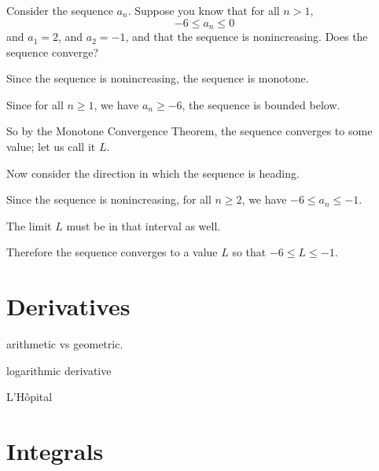 \documentclass{ximera}
\begin{document}
\begin{question}
  Consider the sequence $a_{n}$.  Suppose you know that for all $n >
  1$,
  \[
  -6 \le a_{n} \le 0
  \]
  and $a_{1} = 2$, and $a_{2} = -1$, and that the sequence is
  nonincreasing.  Does the sequence converge?
  \begin{hint}
    Since the sequence is nonincreasing, the sequence is monotone.
  \end{hint}
  \begin{hint}
    Since for all $n \ge 1$, we have $a_{n} \ge -6$, the sequence is
    bounded below.
  \end{hint}
  \begin{hint}
    So by the Monotone Convergence Theorem, the sequence converges to
    some value; let us call it $L$.
  \end{hint}
  \begin{hint}
    Now consider the direction in which the sequence is heading.
  \end{hint}
  \begin{hint}
    Since the sequence is nonincreasing, for all $n \ge 2$, we have
    $-6 \le a_{n} \le -1$.
  \end{hint}
  \begin{hint}
    The limit $L$ must be in that interval as well.
  \end{hint}
  \begin{hint}
    Therefore the sequence converges to a value $L$ so that $-6 \le L
    \le -1$.
  \end{hint}
  \begin{multipleChoice}
  \end{multipleChoice}
\end{question}




\section{Derivatives}

arithmetic vs geometric.

logarithmic derivative


L'H\^opital

\section{Integrals}
\end{document}
